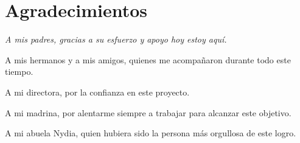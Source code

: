 %
\chapter*{Agradecimientos}
%
{\itshape
A mis padres, gracias a su esfuerzo y apoyo hoy estoy aquí.

A mis hermanos y a mis amigos, quienes me acompañaron durante todo
este tiempo.

A mi directora, por la confianza en este proyecto.

A mi madrina, por alentarme siempre a trabajar para alcanzar este
objetivo.

A mi abuela Nydia, quien hubiera sido la persona más orgullosa de este
logro.
}
